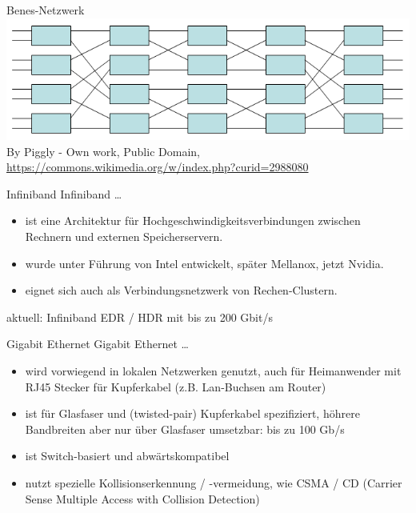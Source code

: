 \begin{defi}{Benes-Netzwerk}
    \includegraphics[width=\textwidth]{images/Benesnetwork.png}
    By Piggly - Own work, Public Domain, \url{https://commons.wikimedia.org/w/index.php?curid=2988080}
\end{defi}

\begin{defi}{Infiniband}
    Infiniband \ldots
    \begin{itemize}[\ldots]
        \item ist eine Architektur für Hochgeschwindigkeitsverbindungen zwischen Rechnern und externen Speicherservern.
        \item wurde unter Führung von Intel entwickelt, später Mellanox, jetzt Nvidia.
        \item eignet sich auch als Verbindungsnetzwerk von Rechen-Clustern.
    \end{itemize}
    aktuell: Infiniband EDR / HDR mit bis zu 200 Gbit/s
\end{defi}

\begin{defi}{Gigabit Ethernet}
    Gigabit Ethernet \ldots
    \begin{itemize}[\ldots]
        \item wird vorwiegend in lokalen Netzwerken genutzt,
              auch für Heimanwender mit RJ45 Stecker für Kupferkabel (z.B. Lan-Buchsen am Router)
        \item ist für Glasfaser und (twisted-pair) Kupferkabel spezifiziert,
              höhrere Bandbreiten aber nur über Glasfaser umsetzbar: bis zu 100 Gb/s
        \item ist Switch-basiert und abwärtskompatibel
        \item nutzt spezielle Kollisionserkennung / -vermeidung,
              wie CSMA / CD (Carrier Sense Multiple Access with Collision Detection)
    \end{itemize}
\end{defi}

